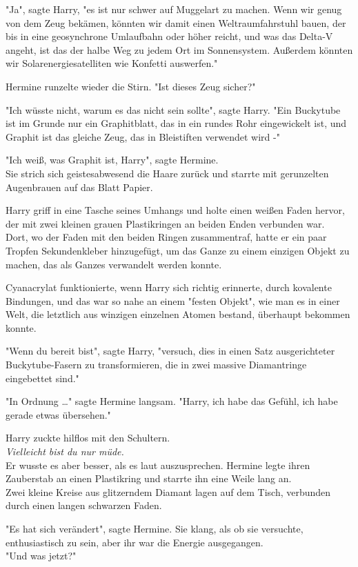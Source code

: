{"Ja", sagte Harry, "es ist nur schwer auf Muggelart zu machen. Wenn wir genug von dem Zeug bekämen, könnten wir damit einen Weltraumfahrstuhl bauen, der bis in eine geosynchrone Umlaufbahn oder höher reicht, und was das Delta-V angeht, ist das der halbe Weg zu jedem Ort im Sonnensystem. Außerdem könnten wir Solarenergiesatelliten wie Konfetti auswerfen."

Hermine runzelte wieder die Stirn. "Ist dieses Zeug sicher?"

"Ich wüsste nicht, warum es das nicht sein sollte", sagte Harry. "Ein Buckytube ist im Grunde nur ein Graphitblatt, das in ein rundes Rohr eingewickelt ist, und Graphit ist das gleiche Zeug, das in Bleistiften verwendet wird -"

"Ich weiß, was Graphit ist, Harry", sagte Hermine.\\ Sie strich sich geistesabwesend die Haare zurück und starrte mit gerunzelten Augenbrauen auf das Blatt Papier.

Harry griff in eine Tasche seines Umhangs und holte einen weißen Faden hervor, der mit zwei kleinen grauen Plastikringen an beiden Enden verbunden war.\\ Dort, wo der Faden mit den beiden Ringen zusammentraf, hatte er ein paar Tropfen Sekundenkleber hinzugefügt, um das Ganze zu einem einzigen Objekt zu machen, das als Ganzes verwandelt werden konnte.

Cyanacrylat funktionierte, wenn Harry sich richtig erinnerte, durch kovalente Bindungen, und das war so nahe an einem "festen Objekt", wie man es in einer Welt, die letztlich aus winzigen einzelnen Atomen bestand, überhaupt bekommen konnte.

"Wenn du bereit bist", sagte Harry, "versuch, dies in einen Satz ausgerichteter Buckytube-Fasern zu transformieren, die in zwei massive Diamantringe eingebettet sind."

"In Ordnung …" sagte Hermine langsam. "Harry, ich habe das Gefühl, ich habe gerade etwas übersehen."

Harry zuckte hilflos mit den Schultern.\\ \emph{Vielleicht bist du nur müde.}\\ Er wusste es aber besser, als es laut auszusprechen. Hermine legte ihren Zauberstab an einen Plastikring und starrte ihn eine Weile lang an.\\ Zwei kleine Kreise aus glitzerndem Diamant lagen auf dem Tisch, verbunden durch einen langen schwarzen Faden.

"Es hat sich verändert", sagte Hermine. Sie klang, als ob sie versuchte, enthusiastisch zu sein, aber ihr war die Energie ausgegangen.\\ "Und was jetzt?"

}
